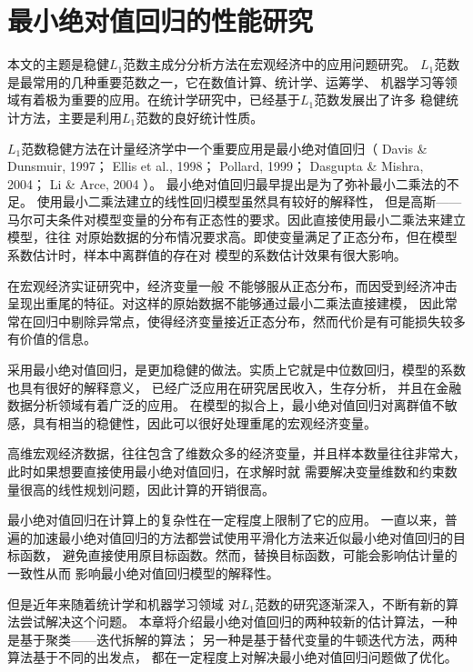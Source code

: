 \section{最小绝对值回归的性能研究}\label{chapter3}

本文的主题是稳健$L_1$范数主成分分析方法在宏观经济中的应用问题研究。
$L_1$范数是最常用的几种重要范数之一，它在数值计算、统计学、运筹学、
机器学习等领域有着极为重要的应用。在统计学研究中，已经基于$L_1$范数发展出了许多
稳健统计方法\cite{dodge2012statistical}，主要是利用$L_1$范数的良好统计性质。

$L_1$范数稳健方法在计量经济学中一个重要应用是最小绝对值回归（
Davis \& Dunsmuir, 1997\cite{davis1997least}；
Ellis et al., 1998\cite{ellis1998instability}；
Pollard, 1999\cite{pollard1991asymptotics}；
Dasgupta \& Mishra, 2004\cite{dasgupta2004least}；
Li \& Arce, 2004\cite{li2004maximum}
）。
最小绝对值回归最早提出是为了弥补最小二乘法的不足。
使用最小二乘法建立的线性回归模型虽然具有较好的解释性，
但是高斯——马尔可夫条件对模型变量的分布有正态性的要求。因此直接使用最小二乘法来建立模型，往往
对原始数据的分布情况要求高。即使变量满足了正态分布，但在模型系数估计时，样本中离群值的存在对
模型的系数估计效果有很大影响。

在宏观经济实证研究中，经济变量一般
不能够服从正态分布，而因受到经济冲击呈现出重尾的特征。对这样的原始数据不能够通过最小二乘法直接建模，
因此常常在回归中剔除异常点，使得经济变量接近正态分布，然而代价是有可能损失较多有价值的信息。

采用最小绝对值回归，是更加稳健的做法。实质上它就是中位数回归，模型的系数也具有很好的解释意义，
已经广泛应用在研究居民收入\cite{dasgupta2004least}，生存分析\cite{ying1995survival}，
并且在金融数据分析领域有着广泛的应用\cite{dasgupta2004least}。
在模型的拟合上，最小绝对值回归对离群值不敏感，具有相当的稳健性，因此可以很好处理重尾的宏观经济变量。

高维宏观经济数据，往往包含了维数众多的经济变量，并且样本数量往往非常大，
此时如果想要直接使用最小绝对值回归，在求解时就
需要解决变量维数和约束数量很高的线性规划问题，因此计算的开销很高。

最小绝对值回归在计算上的复杂性在一定程度上限制了它的应用。
一直以来，普遍的加速最小绝对值回归的方法都尝试使用平滑化方法来近似最小绝对值回归的目标函数，
避免直接使用原目标函数。然而，替换目标函数，可能会影响估计量的一致性从而
影响最小绝对值回归模型的解释性。

但是近年来随着统计学和机器学习领域
对$L_1$范数的研究逐渐深入，不断有新的算法尝试解决这个问题。
本章将介绍最小绝对值回归的两种较新的估计算法，一种是基于聚类——迭代拆解的算法；
另一种是基于替代变量的牛顿迭代方法，两种算法基于不同的出发点，
都在一定程度上对解决最小绝对值回归问题做了优化。

